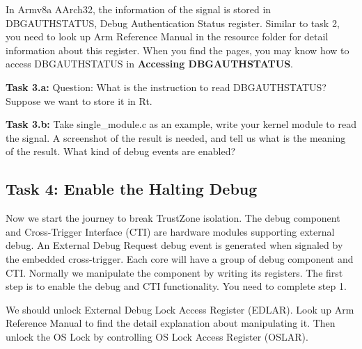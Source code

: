 In Armv8a AArch32, the information of the signal is stored in DBGAUTHSTATUS, Debug Authentication Status register. Similar to task 2, you need to look up Arm Reference Manual in the resource folder for detail information about this register. When you find the pages, you may know how to access DBGAUTHSTATUS in \textbf{Accessing DBGAUTHSTATUS}.

\textbf{Task 3.a:} Question: What is the instruction to read DBGAUTHSTATUS? Suppose we want to store it in Rt.

\textbf{Task 3.b:} Take single\_module.c as an example, write your kernel module to read the signal. A screenshot of the result is needed, and tell us what is the meaning of the result. What kind of debug events are enabled?

\subsection{Task 4: Enable the Halting Debug}

Now we start the journey to break TrustZone isolation. The debug component and Cross-Trigger Interface (CTI) are hardware modules supporting external debug. An External Debug Request debug event is generated when signaled by the embedded cross-trigger. Each core will have a group of debug component and CTI. Normally we manipulate the component by writing its registers. The first step is to enable the debug and CTI functionality. You need to complete step 1.

We should unlock External Debug Lock Access Register (EDLAR). Look up Arm Reference Manual to find the detail explanation about manipulating it. Then unlock the OS Lock by controlling OS Lock Access Register (OSLAR).


